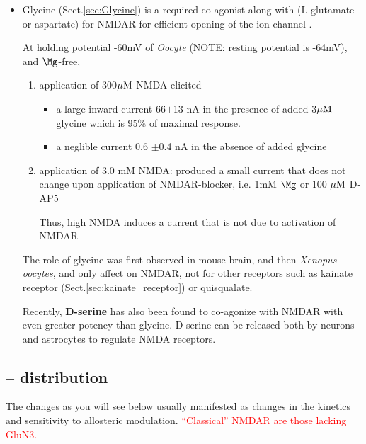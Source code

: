 \begin{itemize}

  \item Glycine (Sect.\ref{sec:Glycine}) is a required co-agonist along with
  (L-glutamate or aspartate) for NMDAR for efficient opening of the ion channel
  \citep{blanke2009}.

At holding potential -60mV of {\it Oocyte} (NOTE: resting potential is -64mV),
and $\Mg$-free,
\begin{enumerate}
  \item  application of 300${\mu\text{M}}$ NMDA elicited 
\begin{itemize}
  \item  a large inward current 66$\pm$13 nA in the presence of added 3${\mu\text{M}}$
  glycine which is 95\% of maximal response.
  
  \item a neglible current 0.6 $\pm$0.4 nA in the absence of added glycine
  
\end{itemize}

  \item application of 3.0 mM NMDA: produced a small current
  that does not change upon application of NMDAR-blocker, i.e. 1mM $\Mg$ or 100
  ${\mu\text{M}}$ D-AP5
  
  Thus, high NMDA induces a current that is not due to activation of NMDAR
\end{enumerate}

The role of glycine was first observed in mouse brain, and then {\it Xenopus
oocytes}, and only affect on NMDAR, not for other receptors such as kainate
receptor (Sect.\ref{sec:kainate_receptor}) or quisqualate.
  
Recently, {\bf D-serine} has also been found to co-agonize with NMDAR with even
greater potency than glycine.  D-serine can be released both by neurons and
astrocytes to regulate NMDA receptors.


  
\end{itemize}

\subsection{-- distribution}
\label{sec:NMDAR-distribution}

The changes as you will see below usually manifested as changes in the
kinetics and sensitivity to allosteric modulation. 
\textcolor{red}{``Classical'' NMDAR are those lacking GluN3.} 

